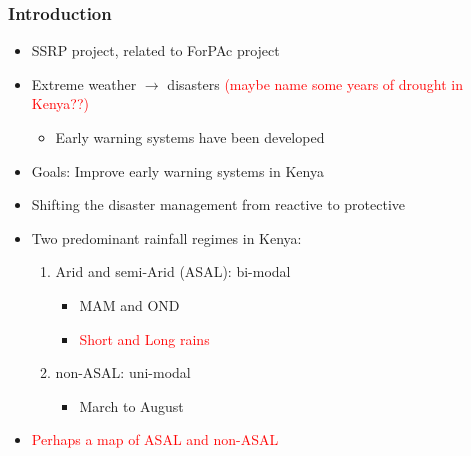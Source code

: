 \documentclass{beamer}              %
\begin{document}
\begin{frame}\label{Introduction}
\frametitle{Introduction} 
 \begin{itemize}
\item SSRP project, related to ForPAc project
\item Extreme weather $\rightarrow$ disasters \textcolor{red}{(maybe name some years of drought in Kenya??)}

\begin{itemize}
\item Early warning systems have been developed
\end{itemize}
\item Goals: Improve early warning systems in Kenya
\item Shifting the disaster management from reactive to protective
\end{itemize} 

\begin{itemize}
\item Two predominant rainfall regimes in Kenya:

\begin{enumerate}
\item Arid and semi-Arid (ASAL): bi-modal
	\begin{itemize}
	\item MAM and OND
	\item \textcolor{red}{Short and Long rains}
	\end{itemize}
\item non-ASAL: uni-modal
	\begin{itemize}
	\item March to August
	\end{itemize}

\end{enumerate}
\item \textcolor{red}{Perhaps a map of ASAL and non-ASAL}

\end{itemize}
\end{frame}


\end{document}

